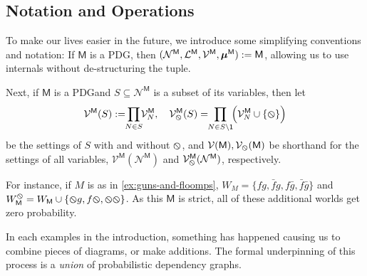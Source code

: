 \documentclass{article}
\newcommand{\none}{\varobslash}
\newcommand\bmu{\boldsymbol{\mu}}
\newcommand{\V}{\mathcal V}
\newcommand{\N}{\mathcal N}
\newcommand{\sfM}{\mathsf M}
\newcommand{\modelname}{probabilistic dependency graph}
\newcommand{\modelnames}{\modelname s}
\newcommand{\MN}{PDG}
\begin{document}

	\subsection{Notation and Operations}

	To make our lives easier in the future, we introduce some simplifying conventions and notation:
	If $\sfM$ is a \MN, then $\mnvars[^\sfM] := \sfM$, allowing us to use internals without de-structuring the tuple.
	
	Next, if $\sfM$ is a \MN and $S \subseteq \N^\sfM$ is a subset of its variables, then let 
	$$\V^\sfM(S) :=  \!\!\prod_{N \in S} \!\!\V^\sfM_N,\quad \V^{\sfM}_\none(S) = \!\!\prod_{N \in S \setminus \sf 1}\!\!\Big(\V^\sfM_N \cup \{\none\} \Big)$$
	be the settings of $S$ with and without $\none$, and $\V(\sfM), \V_\none(\sfM)$ be shorthand for the settings of all variables, $\V^\sfM(\N^\sfM)$ and $\V_\none^\sfM(\N^\sfM)$, respectively.
	
	For instance, if $M$ is as in \cref{ex:guns-and-floomps}, 
	$W_M = \{fg, \bar f g, f \bar g, \bar f \bar g \}$ and 
	$W_\sfM^\none = W_\sfM \cup \{ \none g, f \none, \none\none \}$. As this $\sfM$ is strict, all of these additional worlds get zero probability. 
	
	
	In each examples in the introduction, something has happened causing us to combine pieces of diagrams, or make additions. The formal underpinning of this process is a \emph{union} of \modelnames.
\end{document}
